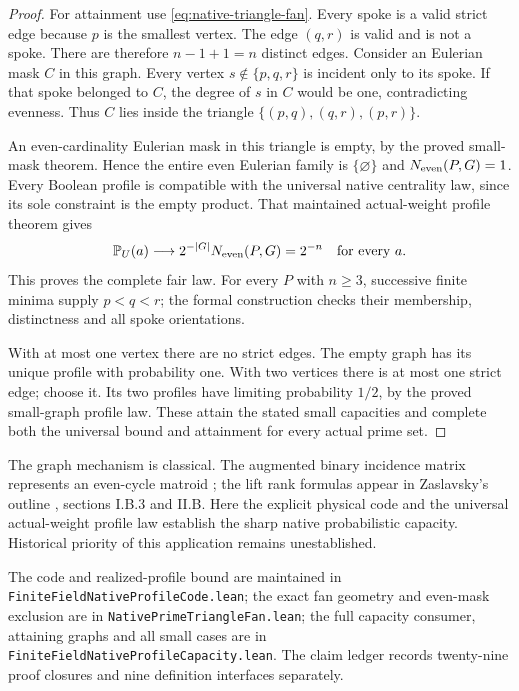 \documentclass[11pt]{article}
\begin{document}
\begin{proof}
For attainment use \eqref{eq:native-triangle-fan}.
Every spoke is a valid strict edge because \(p\) is the smallest
vertex. The edge \((q,r)\) is valid and is not a spoke.
There are therefore \(n-1+1=n\) distinct edges.
Consider an Eulerian mask \(C\) in this graph.
Every vertex \(s\notin\{p,q,r\}\) is incident only to its spoke.
If that spoke belonged to \(C\), the degree of \(s\) in \(C\)
would be one, contradicting evenness.
Thus \(C\) lies inside the triangle
\(\{(p,q),(q,r),(p,r)\}\).

An even-cardinality Eulerian mask in this triangle is empty, by the
proved small-mask theorem. Hence the entire even Eulerian family
is \(\{\varnothing\}\) and \(N_{\rm even}(P,G)=1\).
Every Boolean profile is compatible with the universal native
centrality law, since its sole constraint is the empty product.
That maintained actual-weight profile theorem gives
\[
          \mathbb P_U(a)\longrightarrow
                2^{-|G|}N_{\rm even}(P,G)=2^{-n}
                         \quad\text{for every }a.
\]
This proves the complete fair law. For every \(P\) with \(n\geq3\),
successive finite minima supply \(p<q<r\); the formal construction
checks their membership, distinctness and all spoke orientations.

With at most one vertex there are no strict edges.
The empty graph has its unique profile with probability one.
With two vertices there is at most one strict edge; choose it.
Its two profiles have limiting probability \(1/2\), by the proved
small-graph profile law.
These attain the stated small capacities and complete both the
universal bound and attainment for every actual prime set.
\end{proof}

The graph mechanism is classical. The augmented binary incidence
matrix represents an even-cycle matroid
\cite{GueninEvenCycleMatroids}; the lift rank formulas appear in
Zaslavsky's outline \cite{ZaslavskyOtherMatroids},
sections I.B.3 and II.B.
Here the explicit physical code and the universal actual-weight
profile law establish the sharp native probabilistic capacity.
Historical priority of this application remains unestablished.

The code and realized-profile bound are maintained in
\texttt{FiniteFieldNativeProfileCode.lean}; the exact fan geometry
and even-mask exclusion are in \texttt{NativePrimeTriangleFan.lean};
the full capacity consumer, attaining graphs and all small cases
are in \texttt{FiniteFieldNativeProfileCapacity.lean}.
The claim ledger records twenty-nine proof closures and nine
definition interfaces separately.
\end{document}

